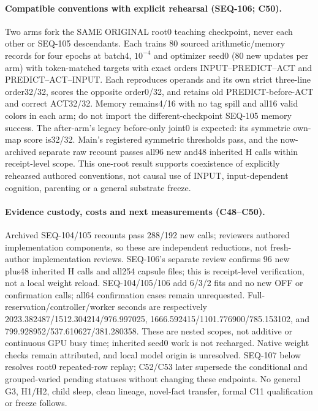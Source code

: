 \documentclass{article}
\begin{document}
\paragraph{Compatible conventions with explicit rehearsal (SEQ-106; C50).} Two arms fork the SAME ORIGINAL root0 teaching checkpoint, never each other or SEQ-105 descendants. Each trains 80 sourced arithmetic/memory records for four epochs at batch4, $10^{-4}$ and optimizer seed0 (80 new updates per arm) with token-matched targets with exact orders INPUT--PREDICT--ACT and PREDICT--ACT--INPUT. Each reproduces operands and its own strict three-line order32/32, scores the opposite order0/32, and retains old PREDICT-before-ACT and correct ACT32/32. Memory remains4/16 with no tag spill and all16 valid colors in each arm; do not import the different-checkpoint SEQ-105 memory success. The after-arm's legacy before-only joint0 is expected: its symmetric own-map score is32/32. Main's registered symmetric thresholds pass, and the now-archived separate raw recount passes all96 new and48 inherited H calls within receipt-level scope. This one-root result supports coexistence of explicitly rehearsed authored conventions, not causal use of INPUT, input-dependent cognition, parenting or a general substrate freeze.

\paragraph{Evidence custody, costs and next measurements (C48--C50).} Archived SEQ-104/105 recounts pass 288/192 new calls; reviewers authored implementation components, so these are independent reductions, not fresh-author implementation reviews. SEQ-106's separate review confirms 96 new plus48 inherited H calls and all254 capsule files; this is receipt-level verification, not a local weight reload. SEQ-104/105/106 add 6/3/2 fits and no new OFF or confirmation calls; all64 confirmation cases remain unrequested. Full-reservation/controller/worker seconds are respectively 2023.382487/1512.304214/976.997025, 1666.592415/1101.776900/785.153102, and 799.928952/537.610627/381.280358. These are nested scopes, not additive or continuous GPU busy time; inherited seed0 work is not recharged. Native weight checks remain attributed, and local model origin is unresolved. SEQ-107 below resolves root0 repeated-row replay; C52/C53 later supersede the conditional and grouped-varied pending statuses without changing these endpoints. No general G3, H1/H2, child sleep, clean lineage, novel-fact transfer, formal C11 qualification or freeze follows.
\end{document}
